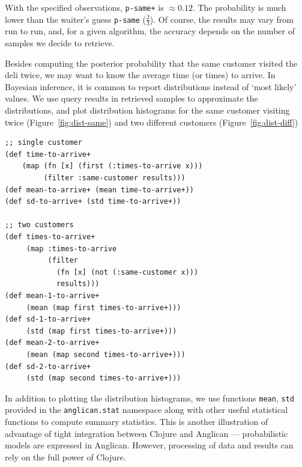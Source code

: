 \documentclass[preprint]{sigplanconf}
\begin{document}
With the specified observations, \texttt{p-same+} is $\approx
0.12$. The probability is much lower than the
waiter's guess \texttt{p-same} ($\frac 2 3$).
Of course, the results may vary from run to run, and, for a given
algorithm, the accuracy depends on the number of samples we
decide to retrieve. 

Besides computing the posterior probability that the same
customer visited the deli twice, we may want to know the average
time (or times) to arrive. In Bayesian inference, it is common
to report distributions instead of `most likely' values. We use
query results in retrieved samples to approximate the
distributions, and plot distribution histograms for the same
customer visiting twice (Figure~\ref{fig:dist-same}) and
two different customers (Figure~\ref{fig:dist-diff})

\begin{lstlisting}[style=default]
;; single customer                      
(def time-to-arrive+ 
    (map (fn [x] (first (:times-to-arrive x)))
         (filter :same-customer results)))
(def mean-to-arrive+ (mean time-to-arrive+))
(def sd-to-arrive+ (std time-to-arrive+))

;; two customers
(def times-to-arrive+ 
     (map :times-to-arrive 
          (filter  
            (fn [x] (not (:same-customer x)))
            results)))
(def mean-1-to-arrive+
     (mean (map first times-to-arrive+)))
(def sd-1-to-arrive+
     (std (map first times-to-arrive+)))
(def mean-2-to-arrive+
     (mean (map second times-to-arrive+)))
(def sd-2-to-arrive+
     (std (map second times-to-arrive+)))
\end{lstlisting}

In addition to plotting the distribution histograms, we use
functions \texttt{mean}, \texttt{std} provided
in the \texttt{anglican.{\linebreak[0]}stat} namespace
along with other useful statistical functions to compute
summary statistics. This is another illustration of advantage of
tight integration between Clojure and Anglican --- probabilistic
models are expressed in Anglican. However, processing of data
and results can rely on the full power of Clojure.
\end{document}
